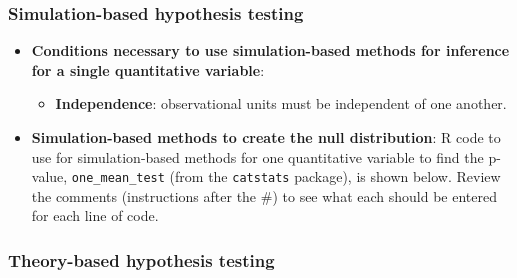 \documentclass[
]{report}
\newenvironment{Shaded}{\begin{snugshade}}{\end{snugshade}}
\newcommand{\AttributeTok}[1]{\textcolor[rgb]{0.13,0.29,0.53}{#1}}
\newcommand{\CommentTok}[1]{\textcolor[rgb]{0.56,0.35,0.01}{\textit{#1}}}
\newcommand{\DecValTok}[1]{\textcolor[rgb]{0.00,0.00,0.81}{#1}}
\newcommand{\FunctionTok}[1]{\textcolor[rgb]{0.13,0.29,0.53}{\textbf{#1}}}
\newcommand{\NormalTok}[1]{#1}
\newcommand{\SpecialCharTok}[1]{\textcolor[rgb]{0.81,0.36,0.00}{\textbf{#1}}}
\newcommand{\StringTok}[1]{\textcolor[rgb]{0.31,0.60,0.02}{#1}}
\providecommand{\tightlist}{%
  \setlength{\itemsep}{0pt}\setlength{\parskip}{0pt}}
\begin{document}
\subsubsection*{Simulation-based hypothesis testing}\label{simulation-based-hypothesis-testing}

\begin{itemize}
\item
  \textbf{Conditions necessary to use simulation-based methods for inference for a single quantitative variable}:

  \begin{itemize}
  \tightlist
  \item
    \textbf{Independence}: observational units must be independent of one another.
  \end{itemize}
\item
  \textbf{Simulation-based methods to create the null distribution}: R code to use for simulation-based methods for one quantitative variable to find the p-value, \texttt{one\_mean\_test} (from the \texttt{catstats} package), is shown below. Review the comments (instructions after the \#) to see what each should be entered for each line of code.

\begin{Shaded}
\end{Shaded}
\end{itemize}

\subsubsection*{Theory-based hypothesis testing}\label{theory-based-hypothesis-testing}
\end{document}
